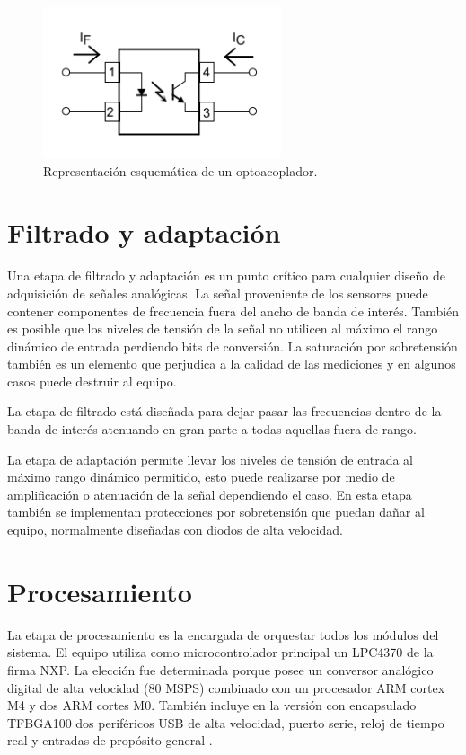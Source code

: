 \begin{figure}[ht]
	\centering
	\includegraphics[width=70mm]{./Figures/opto.png}
	\caption{Representación esquemática de un optoacoplador.}
	\label{fig:opto}
\end{figure}

\section{Filtrado y adaptación}
Una etapa de filtrado y adaptación es un punto crítico para cualquier diseño de adquisición de señales analógicas. La señal proveniente de los sensores puede contener componentes de frecuencia fuera del ancho de banda de interés. También es posible que los niveles de tensión de la señal no utilicen al máximo el rango dinámico de entrada perdiendo bits de conversión. La saturación por sobretensión también es un elemento que perjudica a la calidad de las mediciones y en algunos casos puede destruir al equipo. 

La etapa de filtrado está diseñada para dejar pasar las frecuencias dentro de la banda de interés atenuando en gran parte a todas aquellas fuera de rango.

La etapa de adaptación permite llevar los niveles de tensión de entrada al máximo rango dinámico permitido, esto puede realizarse por medio de amplificación o atenuación de la señal dependiendo el caso. En esta etapa también se implementan protecciones por sobretensión que puedan dañar al equipo, normalmente diseñadas con diodos de alta velocidad.

\section{Procesamiento}
La etapa de procesamiento es la encargada de orquestar todos los módulos del sistema. El equipo utiliza como microcontrolador principal un LPC4370 de la firma NXP. La elección fue determinada porque posee un conversor analógico digital de alta velocidad (80 MSPS) combinado con un procesador ARM cortex M4 y dos ARM cortes M0. También incluye en la versión con encapsulado TFBGA100 dos periféricos USB de alta velocidad, puerto serie, reloj de tiempo real y entradas de propósito general \citep{micro:lpc4370}.

